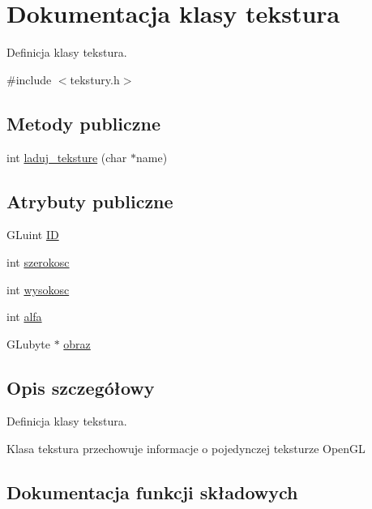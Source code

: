 \hypertarget{classtekstura}{}\section{Dokumentacja klasy tekstura}
\label{classtekstura}


Definicja klasy tekstura.  




{\ttfamily \#include $<$tekstury.\+h$>$}

\subsection*{Metody publiczne}
\begin{DoxyCompactItemize}
\item 
int \mbox{\hyperlink{classtekstura_a0cfe352dfea60a073bd546748c1a06b1}{laduj\+\_\+teksture}} (char $\ast$name)
\end{DoxyCompactItemize}
\subsection*{Atrybuty publiczne}
\begin{DoxyCompactItemize}
\item 
G\+Luint \mbox{\hyperlink{classtekstura_a39a96db98ae4b45adbf37589a9f43a82}{ID}}
\item 
int \mbox{\hyperlink{classtekstura_ad29153487f36c0001b0a0343186504e2}{szerokosc}}
\item 
int \mbox{\hyperlink{classtekstura_a9072bd067d6d05da6b0c83bb18db8172}{wysokosc}}
\item 
int \mbox{\hyperlink{classtekstura_a4ea10d7111e7689efe1168d4735ee00e}{alfa}}
\item 
G\+Lubyte $\ast$ \mbox{\hyperlink{classtekstura_a959484f51bdc568215a4f05dbc3f0210}{obraz}}
\end{DoxyCompactItemize}


\subsection{Opis szczegółowy}
Definicja klasy tekstura. 

Klasa tekstura przechowuje informacje o pojedynczej teksturze Open\+GL 

\subsection{Dokumentacja funkcji składowych}
\mbox{\label{classtekstura_a0cfe352dfea60a073bd546748c1a06b1}} 
